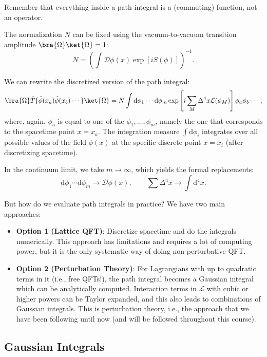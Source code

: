 \begin{remark}
    Remember that everything inside a path integral is a (commuting) function, not an operator.
\end{remark}

The normalization $N$ can be fixed using the vacuum-to-vacuum transition amplitude $\bra{\Omega} \ket{\Omega} = 1$:
\[
    N = \left( \int \mathcal{D} \phi(x) \exp\left[i S(\phi)\right] \right)^{-1}.
\]

We can rewrite the discretized version of the path integral:
\[
    \bra{\Omega} \hat{T} \{\hat{\phi}(x_a) \hat{\phi}(x_b) \cdots\} \ket{\Omega} = N \int \mathrm{d} \phi_1 \cdots \mathrm{d} \phi_m \exp\left[i \sum_{M} \Delta^4 x \mathcal{L}(\phi_M)\right] \phi_a \phi_b \cdots,
\]
where, again, $\phi_a$ is equal to one of the $\phi_1, \ldots, \phi_m$, namely the one that corresponds to the spacetime point $x = x_a$. The integration measure $\int \mathrm{d}\phi_i$ integrates over all possible values of the field $\phi(x)$ at the specific discrete point $x = x_i$ (after discretizing spacetime).


In the continuum limit, we take $m \to \infty$, which yields the formal replacements:
\[
    \mathrm{d}\phi_1 \cdots \mathrm{d}\phi_m \to \mathcal{D}\phi(x), \qquad \sum \Delta^4 x \to \int \mathrm{d}^4 x.
\]

But how do we evaluate path integrals in practice? We have two main approaches:
\begin{itemize}
    \item \textbf{Option 1 (Lattice QFT)}: Discretize spacetime and do the integrals numerically. This approach has limitations and requires a lot of computing power, but it is the only systematic way of doing non-perturbative QFT.
    \item \textbf{Option 2 (Perturbation Theory)}: For Lagrangians with up to quadratic terms in it (i.e., free QFTs!), the path integral becomes a Gaussian integral which can be analytically computed. Interaction terms in $\mathcal{L}$ with cubic or higher powers can be Taylor expanded, and this also leads to combinations of Gaussian integrals. This is perturbation theory, i.e., the approach that we have been following until now (and will be followed throughout this course).
\end{itemize}

\subsection{Gaussian Integrals}

